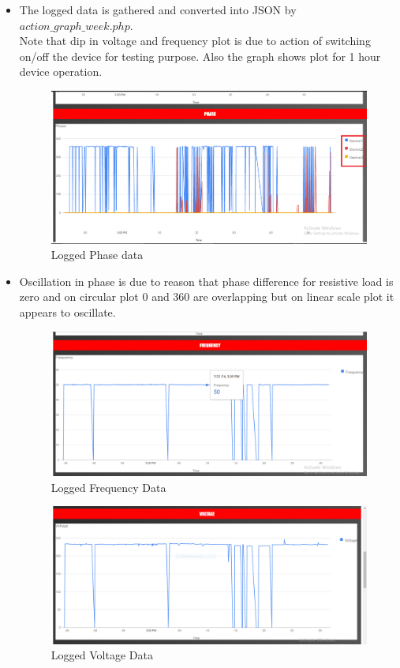 \documentclass[a4paper,12pt,oneside]{book}
\begin{document}
\begin{itemize}
\begin{itemize}
		\item{The logged data is gathered and converted into JSON by $action\_graph\_week.php$. \\ 
		Note that dip in voltage and frequency plot is due to action of switching on/off the device for testing purpose. Also the graph shows plot for 1 hour device operation.}
		\begin{figure}
			\centering
			\includegraphics[width=15cm]{phase_today.png}
			\caption{Logged Phase data}
			\label{5}
		\end{figure}
		\item Oscillation in phase is due to reason that phase difference for resistive load is zero and on circular plot 0 and 360 are overlapping but on linear scale plot it appears to oscillate.
		\begin{figure}
			\centering
			\includegraphics[width=15cm]{frequency_today.png}
			\caption{Logged Frequency Data}
			\label{6}
		\end{figure}
		
		
		
		\begin{figure}[H]  \centering
			\includegraphics[width=14cm]{voltage_today.png}
			\caption{Logged Voltage Data}
			\label{7}
		\end{figure}
		

\end{itemize}
\end{itemize}
\end{document}
